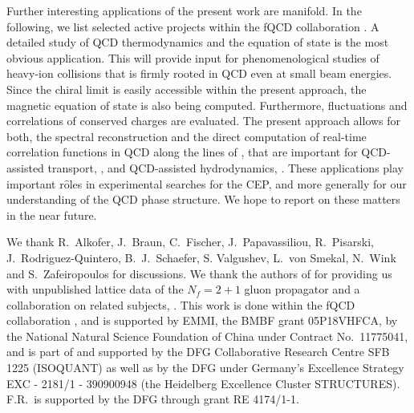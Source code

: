 \documentclass[%
reprint,
superscriptaddress,
showpacs,preprintnumbers,
 amsmath,amssymb,
 aps,
prd,
]{revtex4-1}
\begin{document}
Further interesting applications of the present work are manifold. In
the following, we list selected active projects within the fQCD
collaboration \cite{fQCD}. A detailed study of QCD thermodynamics and
the equation of state is the most obvious application. This will
provide input for phenomenological studies of heavy-ion collisions
that is firmly rooted in QCD even at small beam energies. Since the
chiral limit is easily accessible within the present approach, the
magnetic equation of state is also being computed. Furthermore,
fluctuations and correlations of conserved charges are evaluated. The
present approach allows for both, the spectral reconstruction and the
direct computation of real-time correlation functions in QCD along the
lines of \cite{Floerchinger:2011sc, Strauss:2012dg, Haas:2013hpa,
  Kamikado:2013sia, Silva:2013foa, Christiansen:2014ypa,
  Pawlowski:2015mia, Jung:2016yxl, Pawlowski:2017gxj, Cyrol:2018xeq,
  Tripolt:2018qvi, Dudal:2019gvn, Binosi:2019ecz, Li:2019hyv}, that
are important for QCD-assisted transport, \cite{Bluhm:2018qkf}, and
QCD-assisted hydrodynamics, \cite{Dubla:2018czx}. These applications
play important r$\hat{\textrm{o}}$les in experimental searches for the
CEP, and more generally for our understanding of the QCD phase
structure. We hope to report on these matters in the near future.

\begin{acknowledgments}
  We thank R.~Alkofer, J.~Braun, C.~Fischer, J.~Papavassiliou,
  R.~Pisarski, J.~Rodriguez-Quintero, B.~J.~Schaefer, S. Valgushev,
  L.~von Smekal, N.~Wink and S.~Zafeiropoulos for discussions. We
  thank the authors of \cite{Zafeiropoulos:2019flq, Boucaud:2018xup}
  for providing us with unpublished lattice data of the $N_f=2+1$
  gluon propagator and a collaboration on related subjects,
  \cite{BDRSZ:2019}. This work is done within the fQCD collaboration
  \cite{fQCD}, and is supported by EMMI, the BMBF grant 05P18VHFCA, by
  the National Natural Science Foundation of China under Contract No.\
  11775041, and is part of and supported by the DFG Collaborative
  Research Centre SFB 1225 (ISOQUANT) as well as by the DFG under
  Germany's Excellence Strategy EXC - 2181/1 - 390900948 (the
  Heidelberg Excellence Cluster STRUCTURES). F.R.\ is supported by the
  DFG through grant RE 4174/1-1.

\end{acknowledgments}

\end{document}
